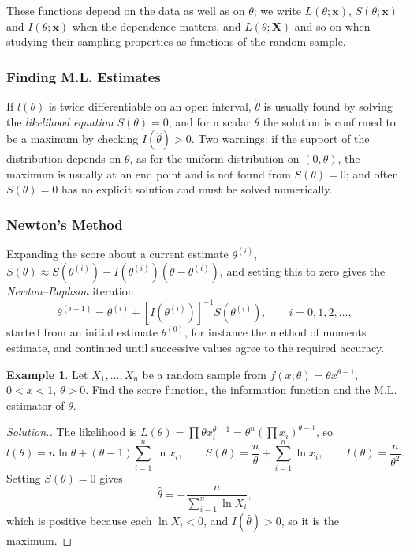 \documentclass[12pt,a4paper]{report}
\theoremstyle{definition}
\newtheorem{example}[thm]{Example}
\theoremstyle{plain}
\newenvironment{solution}
  {\renewcommand{\qedsymbol}{}\begin{proof}[\textit{Solution}.]}
  {\end{proof}}
\begin{document}
These functions depend on the data as well as on $\theta$; we write
$L(\theta;\mathbf x)$, $S(\theta;\mathbf x)$ and $I(\theta;\mathbf x)$ when the
dependence matters, and $L(\theta;\mathbf X)$ and so on when studying their
sampling properties as functions of the random sample.

\subsubsection{Finding M.L. Estimates}

If $l(\theta)$ is twice differentiable on an open interval, $\hat\theta$ is usually
found by solving the \emph{likelihood equation} $S(\theta) = 0$, and for a scalar
$\theta$ the solution is confirmed to be a maximum by checking
$I(\hat{\theta}) > 0$. Two warnings: if the support of the distribution depends on
$\theta$, as for the uniform distribution on $(0,\theta)$, the maximum is usually
at an end point and is not found from $S(\theta) = 0$; and often $S(\theta) = 0$
has no explicit solution and must be solved numerically.

\subsubsection{Newton's Method}
\label{sec:newton}

Expanding the score about a current estimate $\theta^{(i)}$,
$S(\theta)\approx S\left(\theta^{(i)}\right) - I\left(\theta^{(i)}\right)\left(\theta -
\theta^{(i)}\right)$, and setting this to zero gives the \emph{Newton--Raphson}
iteration
\[\theta^{(i + 1)} = \theta^{(i)} + \left[I\left(\theta^{(i)}\right)\right]^{-1}
S\left(\theta^{(i)}\right) ,\qquad i = 0, 1, 2, \dots ,\]
started from an initial estimate $\theta^{(0)}$, for instance the method of
moments estimate, and continued until successive values agree to the required
accuracy.

\begin{example}
\label{ex:mlepower}
Let $X_1, \dots , X_n$ be a random sample from
$f(x;\theta) = \theta x^{\theta - 1}$, $0< x < 1$, $\theta > 0$. Find the score
function, the information function and the M.L. estimator of $\theta$.
\end{example}

\begin{solution}
The likelihood is
$L(\theta) = \prod \theta x_i^{\theta - 1} = \theta^n\left(\prod x_i\right)^{\theta -
1}$, so
\[l(\theta) = n\ln \theta + (\theta - 1) \sum^n_{i = 1} \ln x_i ,\qquad S(\theta)
= \frac{n}{\theta} + \sum^n_{i = 1} \ln x_i ,\qquad I(\theta) =
\frac{n}{\theta^2} .\]
Setting $S(\theta) = 0$ gives
\[\hat{\theta} = -\frac{n}{\sum^n_{i = 1}\ln X_i} ,\]
which is positive because each $\ln X_i<0$, and $I(\hat\theta)>0$, so it is the
maximum.
\end{solution}
\end{document}
